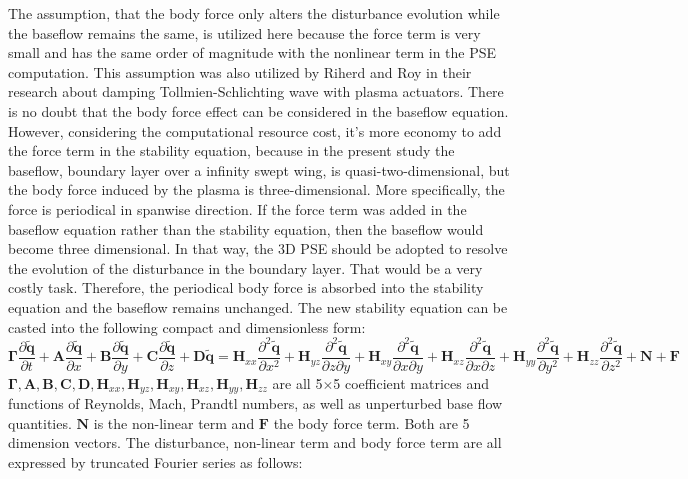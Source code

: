 \documentclass{AIAA}
\begin{document}
The assumption, that the body force only alters the disturbance evolution while the baseflow remains the same, is utilized here because the force term is very small and has the same order of magnitude with the nonlinear term in the PSE computation. This assumption was also utilized by Riherd and Roy \cite{Riherd2013} in their research about damping Tollmien-Schlichting wave with plasma actuators. There is no doubt that the body force effect can be considered in the baseflow equation\cite{Brandt2011,Marquet2008,Giannetti2007}. However, considering the computational resource cost, it's more economy to add the force term in the stability equation, because in the present study the baseflow, boundary layer over a infinity swept wing, is quasi-two-dimensional, but the body force induced by the plasma is three-dimensional. More specifically, the force is periodical in spanwise direction. If the force term was added in the baseflow equation rather than the stability equation, then the baseflow would become three dimensional. In that way, the 3D PSE should be adopted to resolve the evolution of the disturbance in the boundary layer. That would be a very costly task. Therefore, the periodical body force is absorbed into the stability equation and the baseflow remains unchanged. The new stability equation can be casted into the following compact and dimensionless form:
\begin{equation}
 \label{e:disturbanceEq}
 {\mathbf{\Gamma }}\frac{{\partial {\mathbf{\tilde q}}}}
 {{\partial t}} + {\mathbf{A}}\frac{{\partial {\mathbf{\tilde q}}}}
 {{\partial x}} + {\mathbf{B}}\frac{{\partial {\mathbf{\tilde q}}}}
 {{\partial y}} + {\mathbf{C}}\frac{{\partial {\mathbf{\tilde q}}}}
 {{\partial z}} + {\mathbf{D\tilde q}} = {\mathbf{H}}_{xx} \frac{{\partial ^2 {\mathbf{\tilde q}}}}
 {{\partial x^2 }} + {\mathbf{H}}_{yz} \frac{{\partial ^2 {\mathbf{\tilde q}}}}
 {{\partial z\partial y}} + {\mathbf{H}}_{xy} \frac{{\partial ^2 {\mathbf{\tilde q}}}}
 {{\partial x\partial y}} + {\mathbf{H}}_{xz} \frac{{\partial ^2 {\mathbf{\tilde q}}}}
 {{\partial x\partial z}} + {\mathbf{H}}_{yy} \frac{{\partial ^2 {\mathbf{\tilde q}}}}
 {{\partial y^2 }} + {\mathbf{H}}_{zz} \frac{{\partial ^2 {\mathbf{\tilde q}}}}
 {{\partial z^2 }} + {\mathbf{N}} + {\mathbf{F}}
\end{equation}
${\mathbf{\Gamma }},{\mathbf{A}},{\mathbf{B}},{\mathbf{C}},{\mathbf{D}},{\mathbf{H}}_{xx} ,{\mathbf{H}}_{yz} ,{\mathbf{H}}_{xy} ,{\mathbf{H}}_{xz} ,{\mathbf{H}}_{yy} ,{\mathbf{H}}_{zz}$ are all 5$\times$5 coefficient matrices and functions of Reynolds, Mach, Prandtl numbers, as well as unperturbed base flow quantities. ${\mathbf{N}}$ is the non-linear term and ${\mathbf{F}}$ the body force term. Both are 5 dimension vectors. The disturbance, non-linear term and body force term are all expressed by truncated Fourier series as follows:
\end{document}
